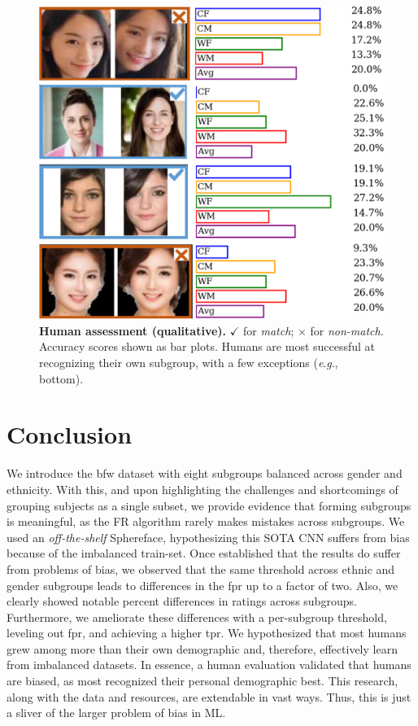 \documentclass[10pt,twocolumn,letterpaper]{article}
\newcommand{\eg}{\textit{e}.\textit{g}., }
\begin{document}



\begin{figure}[t!] 
	\centering    
	\includegraphics[width=.55\linewidth] {figures/human_eval.pdf}
		\caption{\small{\textbf{Human assessment (qualitative).} $\checkmark$ for \emph{match}; $\times$ for \emph{non-match}. Accuracy scores shown as bar plots. Humans are most successful at recognizing their own subgroup, with a few exceptions (\eg bottom).}}
		\label{fig:human-eval} 
		 \vspace{-5mm}
\end{figure} 


\section{Conclusion}
We introduce the \gls{bfw} dataset with eight subgroups balanced across gender and ethnicity. With this, and upon highlighting the challenges and shortcomings of grouping subjects as a single subset, we provide evidence that forming subgroups is meaningful, as the FR algorithm rarely makes mistakes across subgroups. We used an \textit{off-the-shelf} Sphereface, hypothesizing this SOTA CNN suffers from bias because of the imbalanced train-set. Once established that the results do suffer from problems of bias, we observed that the same threshold across ethnic and gender subgroups leads to differences in the \gls{fpr} up to a factor of two. Also, we clearly showed notable percent differences in ratings across subgroups. Furthermore, we ameliorate these differences with a per-subgroup threshold, leveling out \gls{fpr}, and achieving a higher \gls{tpr}. We hypothesized that most humans grew among more than their own demographic and, therefore, effectively learn from imbalanced datasets. In essence, a human evaluation validated that humans are biased, as most recognized their personal demographic best. This research, along with the data and resources, are extendable in vast ways. Thus, this is just a sliver of the larger problem of bias in ML.



{\small
\balance


}

% 
\end{document}
